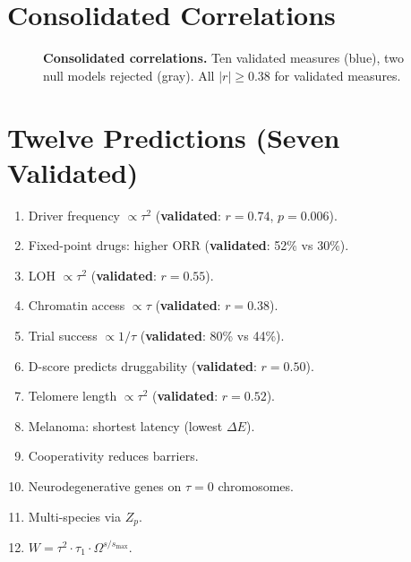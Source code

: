 \documentclass[11pt,a4paper]{article}
\begin{document}
\section{Consolidated Correlations}

\begin{figure}[h]
\centering
{}
\caption{\textbf{Consolidated correlations.} Ten validated measures (blue), two null models rejected (gray). All $|r| \geq 0.38$ for validated measures.}
\label{fig:correlations}
\end{figure}

\section{Twelve Predictions (Seven Validated)}

\begin{enumerate}
\item Driver frequency $\propto \tau^2$ (\textbf{validated}: $r = 0.74$, $p = 0.006$).
\item Fixed-point drugs: higher ORR (\textbf{validated}: 52\% vs 30\%).
\item LOH $\propto \tau^2$ (\textbf{validated}: $r = 0.55$).
\item Chromatin access $\propto \tau$ (\textbf{validated}: $r = 0.38$).
\item Trial success $\propto 1/\tau$ (\textbf{validated}: 80\% vs 44\%).
\item D-score predicts druggability (\textbf{validated}: $r = 0.50$).
\item Telomere length $\propto \tau^2$ (\textbf{validated}: $r = 0.52$).
\item Melanoma: shortest latency (lowest $\Delta E$).
\item Cooperativity reduces barriers.
\item Neurodegenerative genes on $\tau = 0$ chromosomes.
\item Multi-species via $Z_p$.
\item $W = \tau^2 \cdot \tau_1 \cdot \Omega^{s/s_{\max}}$.
\end{enumerate}
\end{document}
